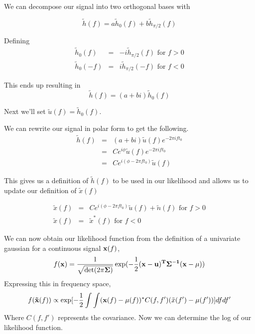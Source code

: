\documentclass{iopart}
\begin{document}
We can decompose our signal into two orthogonal bases with

\begin{equation}
	\tilde{h}(f) = a\tilde{h}_0(f) + b\tilde{h}_{\pi/2}(f)
\end{equation}

Defining
\begin{eqnarray}
	\tilde{h}_0(f) & = & -i \tilde{h}_{\pi/2}(f) \mbox{ for } f > 0 \\
	\tilde{h}_0(-f) & = & i \tilde{h}_{\pi/2}(-f) \mbox{ for } f < 0
\end{eqnarray}

This ends up resulting in
\begin{equation}
	\tilde{h}(f) = (a + bi)\tilde{h}_0(f)
\end{equation}

Next we'll set $\tilde{u}(f) = \tilde{h}_0(f)$. 

We can rewrite our signal in polar form to get the following.
\begin{eqnarray}
	\tilde{h}(f) & = & (a + bi) \tilde{u}(f) e^{-2\pi ift_0} \\
	& = & Ce^{i \phi}\tilde{u}(f)e^{-2\pi ift_0} \\
	& = & Ce^{i(\phi - 2\pi ft_0)}\tilde{u}(f)
\end{eqnarray}

This gives us a definition of $\tilde{h}(f)$ to be used in our likelihood and allows us to update our definition of $\tilde{x}(f)$

\begin{eqnarray}
	\tilde{x}(f) & = & Ce^{i(\phi - 2\pi ft_0)}\tilde{u}(f) + \tilde{n}(f) \mbox{ for } f > 0 \\
	\tilde{x}(f) & = & \tilde{x}^*(f) \mbox{ for } f < 0
\end{eqnarray}

We can now obtain our likelihood function from the definition of a univariate gaussian for a continuous signal ${\bf{x}}(f)$,
\begin{equation}
	f({\bf{x}}) = \frac{1}{\sqrt{\det(2\pi \bf{\Sigma})}}\exp(-\frac{1}{2}(\bf{x}-\bf{u})^T\Sigma^{-1}(\bf{x}-\bf{\mu}))
\end{equation}
Expressing this in frequency space,
\begin{equation}
	f({\bf{\tilde{x}}}(f)) \propto \exp[-\frac{1}{2}\int\int( {\bf{x}}(f)-{\bf{\mu}}(f))^*C(f,f')(\tilde{x}(f')-\mu(f'))]dfdf'
\end{equation}
Where $C(f,f')$ represents the covariance. Now we can determine the log of our likelihood function.
\end{document}
